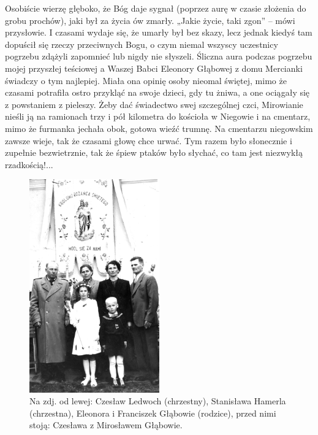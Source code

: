 Osobiście wierzę głęboko, że Bóg daje sygnał (poprzez aurę w czasie złożenia do grobu prochów), jaki był za życia ów zmarły. „Jakie życie, taki zgon” – mówi przysłowie. I czasami wydaje się, że umarły był bez skazy, lecz jednak kiedyś tam dopuścił się rzeczy przeciwnych Bogu, o czym niemal wszyscy uczestnicy pogrzebu zdążyli zapomnieć lub nigdy nie słyszeli. Śliczna aura podczas pogrzebu mojej przyszłej teściowej a Waszej Babci Eleonory Głąbowej z domu Mercianki świadczy o tym najlepiej. Miała ona opinię osoby nieomal świętej, mimo że czasami potrafiła ostro przykląć na swoje dzieci, gdy tu żniwa, a one ociągały się z powstaniem z pieleszy. Żeby dać świadectwo swej szczególnej czci, Mirowianie nieśli ją na ramionach trzy i pół kilometra do kościoła w Niegowie i na cmentarz, mimo że furmanka jechała obok, gotowa wieźć trumnę. Na cmentarzu niegowskim zawsze wieje, tak że czasami głowę chce urwać. Tym razem było słonecznie i zupełnie bezwietrznie, tak że śpiew ptaków było słychać, co tam jest niezwykłą rzadkością!...
\begin{figure}[!h]
\begin{center}
\includegraphics[width=0.5\textwidth]{photo/czeslawa_glab_komunia.jpg}
\caption[Czesława Głąb u I Komunii św.]{Na zdj. od lewej: Czesław Ledwoch (chrzestny), Stanisława Hamerla (chrzestna), Eleonora i Franciszek Głąbowie (rodzice), przed nimi stoją: Czesława z Mirosławem Głąbowie.}
\end{center}
\end{figure}


